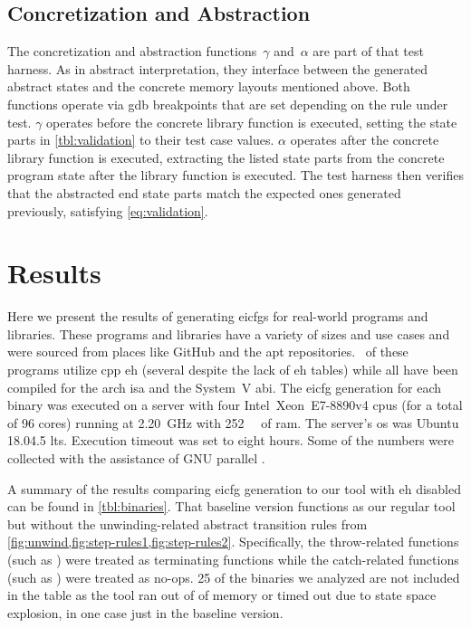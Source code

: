 \subsection{Concretization and Abstraction}
The concretization and abstraction functions~$\gamma$ and~$\alpha$ are part of that test harness.
As in abstract interpretation, they interface between the generated abstract states and the concrete memory layouts mentioned above.
Both functions operate via \ac{gdb} breakpoints that are set depending on the rule under test.
$\gamma$ operates before the concrete library function is executed, setting the state parts in \cref{tbl:validation} to their test case values.
$\alpha$ operates after the concrete library function is executed, extracting the listed state parts from the concrete program state after the library function is executed.
The test harness then verifies that the abstracted end state parts match the expected ones generated previously, satisfying \cref{eq:validation}.

\section{Results}\label{eicfg-results}
Here we present the results of generating \acp{eicfg} for  real-world programs and libraries.
These programs and libraries have a variety of sizes and use cases and were sourced from places like GitHub and the \ac{apt} repositories.
\exceptbins\ of these programs utilize \gls{cpp} \ac{eh} (several despite the lack of \ac{eh} tables) while all have been compiled for the \gls{arch} \ac{isa} and the System~V \ac{abi}.
The \ac{eicfg} generation for each binary was executed on a server with four Intel\textregistered\ Xeon\textregistered\ E7-8890v4 \acp{cpu} (for a total of 96 cores) running at \SI{2.20}{\giga\hertz} with \SI{252}{\gibi\byte} of \ac{ram}.
The server's \ac{os} was Ubuntu 18.04.5 \ac{lts}.
Execution timeout was set to eight hours. %
Some of the numbers were collected with the assistance of GNU parallel \autocite{Tange2011a}.

A summary of the results comparing \ac{eicfg} generation to our tool with \ac{eh} disabled can be found in \cref{tbl:binaries}.
That baseline version functions as our regular tool but without the unwinding-related abstract transition rules from \cref{fig:unwind,fig:step-rules1,fig:step-rules2}. Specifically, the throw-related functions (such as ) were treated as terminating functions while the catch-related functions (such as ) were treated as no-ops.
25 of the binaries we analyzed are not included in the table as the tool ran out of of memory or timed out due to state space explosion, in one case just in the baseline version.

